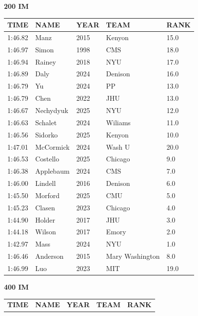 \begin{table}[H]
\centering
\begin{minipage}[t]{0.48\textwidth}
\centering
\textbf{200 IM}\\[0.1cm]
\begin{tabular}{@{}p{1.8cm}p{2.8cm}p{1.2cm}p{1.4cm}p{0.8cm}@{}}
\hline
    \textbf{TIME} & \textbf{NAME} & \textbf{YEAR} & \textbf{TEAM} & \textbf{RANK} \\
\hline
    1:46.82 & Manz & 2015 & Kenyon & 15.0 \\
    1:46.97 & Simon & 1998 & CMS & 18.0 \\
    1:46.94 & Rainey & 2018 & NYU & 17.0 \\
    1:46.89 & Daly & 2024 & Denison & 16.0 \\
    1:46.79 & Yu & 2024 & PP & 13.0 \\
    1:46.79 & Chen & 2022 & JHU & 13.0 \\
    1:46.67 & Nechydyuk & 2025 & NYU & 12.0 \\
    1:46.63 & Schalet & 2024 & Wiliams & 11.0 \\
    1:46.56 & Sidorko & 2025 & Kenyon & 10.0 \\
    1:47.01 & McCormick & 2024 & Wash U & 20.0 \\
    1:46.53 & Costello & 2025 & Chicago & 9.0 \\
    1:46.38 & Applebaum & 2024 & CMS & 7.0 \\
    1:46.00 & Lindell & 2016 & Denison & 6.0 \\
    1:45.50 & Morford & 2025 & CMU & 5.0 \\
    1:45.23 & Clasen & 2023 & Chicago & 4.0 \\
    1:44.90 & Holder & 2017 & JHU & 3.0 \\
    1:44.18 & Wilson & 2017 & Emory & 2.0 \\
    1:42.97 & Mass & 2024 & NYU & 1.0 \\
    1:46.46 & Anderson & 2015 & Mary Washington & 8.0 \\
    1:46.99 & Luo & 2023 & MIT & 19.0 \\
\hline
\end{tabular}
\end{minipage}\hfill
\begin{minipage}[t]{0.48\textwidth}
\centering
\textbf{400 IM}\\[0.1cm]
\begin{tabular}{@{}p{1.8cm}p{2.8cm}p{1.2cm}p{1.4cm}p{0.8cm}@{}}
\hline
    \textbf{TIME} & \textbf{NAME} & \textbf{YEAR} & \textbf{TEAM} & \textbf{RANK} \\

\end{tabular}
\end{minipage}
\end{table}
